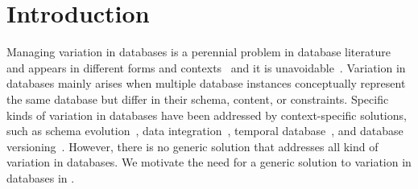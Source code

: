 \chapter{Introduction}
\label{ch:intro}

%


Managing variation in databases is a perennial problem in database literature
and appears in different forms and 
contexts~\cite{curateVdata,ALW21vamos,ready17cidr,clams16sigmod,datahub15cidr}
and it is unavoidable~\cite{dbDecay16Stonebraker}.
%
Variation in databases mainly arises when multiple database instances 
conceptually represent the same database but differ
in their schema, content, or constraints.
%
Specific kinds of variation in databases have been addressed by 
context-specific solutions, such as
schema evolution~\cite{SchEvolRA90McKenzie, 
schVersioning97Castro, tempSchEvol91Ariav, tsql95Snodgrass, 
prima08Moon}, 
data integration~\cite{dataIntegBook}, 
temporal database~\cite{tempDataMng, tempDBSurv, tempDBbook},
and database versioning~\cite{datasetVersioning,dbVersioning}.
%
However, there is no generic solution that addresses all kind of variation
in databases. We motivate the need for a generic solution to variation
in databases in .
%


